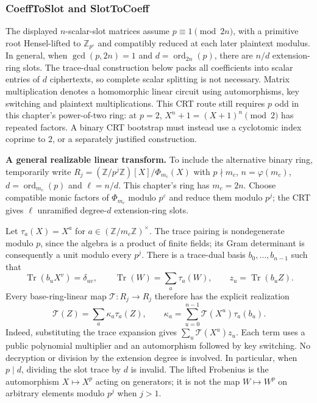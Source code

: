 \subsubsection{\textsf{CoeffToSlot} and \textsf{SlotToCoeff}}
\label{subsubsec:bfv-bootstrapping-coefftoslot}

The displayed $n$-scalar-slot matrices assume $p\equiv1\pmod{2n}$, with a primitive root Hensel-lifted to $\mathbb Z_{p^\varepsilon}$ and compatibly reduced at each later plaintext modulus. In general, when $\gcd(p,2n)=1$ and $d=\operatorname{ord}_{2n}(p)$, there are $n/d$ extension-ring slots. The trace-dual construction below packs all coefficients into scalar entries of $d$ ciphertexts, so complete scalar splitting is not necessary. Matrix multiplication denotes a homomorphic linear circuit using automorphisms, key switching and plaintext multiplications. This CRT route still requires $p$ odd in this chapter's power-of-two ring: at $p=2$, $X^n+1=(X+1)^n\pmod2$ has repeated factors. A binary CRT bootstrap must instead use a cyclotomic index coprime to $2$, or a separately justified construction.

\textbf{A general realizable linear transform.} To include the alternative binary ring, temporarily write $R_j=(\mathbb Z/p^j\mathbb Z)[X]/\Phi_{m_c}(X)$ with $p\nmid m_c$, $n=\varphi(m_c)$, $d=\operatorname{ord}_{m_c}(p)$ and $\ell=n/d$. This chapter's ring has $m_c=2n$. Choose compatible monic factors of $\Phi_{m_c}$ modulo $p^\varepsilon$ and reduce them modulo $p^j$; the CRT gives $\ell$ unramified degree-$d$ extension-ring slots.

Let $\tau_a(X)=X^a$ for $a\in(\mathbb Z/m_c\mathbb Z)^\times$. The trace pairing is nondegenerate modulo $p$, since the algebra is a product of finite fields; its Gram determinant is consequently a unit modulo every $p^j$. There is a trace-dual basis $b_0,\ldots,b_{n-1}$ such that
\[
\operatorname{Tr}(b_uX^v)=\delta_{uv},\qquad
\operatorname{Tr}(W)=\sum_a\tau_a(W),\qquad
z_u=\operatorname{Tr}(b_uZ).
\]
Every base-ring-linear map $\mathcal T:R_j\to R_j$ therefore has the explicit realization
\[
\mathcal T(Z)=\sum_a\kappa_a\tau_a(Z),\qquad
\kappa_a=\sum_{u=0}^{n-1}\mathcal T(X^u)\tau_a(b_u).
\]
Indeed, substituting the trace expansion gives $\sum_u\mathcal T(X^u)z_u$. Each term uses a public polynomial multiplier and an automorphism followed by key switching. No decryption or division by the extension degree is involved. In particular, when $p\mid d$, dividing the slot trace by $d$ is invalid. The lifted Frobenius is the automorphism $X\mapsto X^p$ acting on generators; it is not the map $W\mapsto W^p$ on arbitrary elements modulo $p^j$ when $j>1$.

